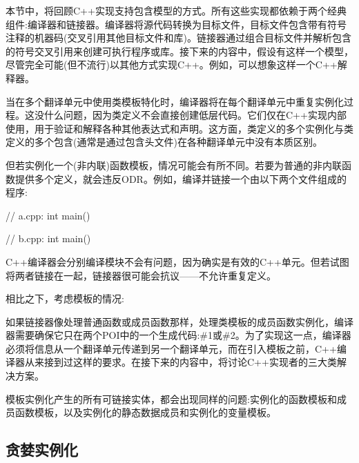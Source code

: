 
本节中，将回顾C++实现支持包含模型的方式。所有这些实现都依赖于两个经典组件:编译器和链接器。编译器将源代码转换为目标文件，目标文件包含带有符号注释的机器码(交叉引用其他目标文件和库)。链接器通过组合目标文件并解析包含的符号交叉引用来创建可执行程序或库。接下来的内容中，假设有这样一个模型，尽管完全可能(但不流行)以其他方式实现C++。例如，可以想象这样一个C++解释器。

当在多个翻译单元中使用类模板特化时，编译器将在每个翻译单元中重复实例化过程。这没什么问题，因为类定义不会直接创建低层代码。它们仅在C++实现内部使用，用于验证和解释各种其他表达式和声明。这方面，类定义的多个实例化与类定义的多个包含(通常是通过包含头文件)在各种翻译单元中没有本质区别。

但若实例化一个(非内联)函数模板，情况可能会有所不同。若要为普通的非内联函数提供多个定义，就会违反ODR。例如，编译并链接一个由以下两个文件组成的程序:

\begin{cpp}
// a.cpp:
int main()
{ }

// b.cpp:
int main()
{ }
\end{cpp}

C++编译器会分别编译模块不会有问题，因为确实是有效的C++单元。但若试图将两者链接在一起，链接器很可能会抗议——不允许重复定义。

相比之下，考虑模板的情况:


如果链接器像处理普通函数或成员函数那样，处理类模板的成员函数实例化，编译器需要确保它只在两个POI中的一个生成代码:\#1或\#2。为了实现这一点，编译器必须将信息从一个翻译单元传递到另一个翻译单元，而在引入模板之前，C++编译器从来接到过这样的要求。在接下来的内容中，将讨论C++实现者的三大类解决方案。

模板实例化产生的所有可链接实体，都会出现同样的问题:实例化的函数模板和成员函数模板，以及实例化的静态数据成员和实例化的变量模板。

\subsection{贪婪实例化}

